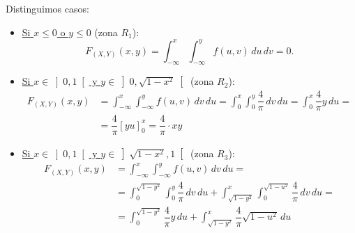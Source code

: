 \begin{ejercicio}
\begin{enumerate}
\begin{figure}[H]
        \end{figure}

        Distinguimos casos:
        \begin{itemize}
            \item \ul{Si $x\leq 0$ \quad o \quad $y\leq 0$} (zona $R_1$):
            \begin{equation*}
                F_{(X,Y)}(x, y) = \int_{-\infty}^x \int_{-\infty}^y f(u, v) \, du \, dv = 0.
            \end{equation*}

            \item \ul{Si $x\in \left]0,1\right[$ \quad y \quad $y\in \left]0,\sqrt{1-x^2}\right[$} (zona $R_2$):
            \begin{align*}
                F_{(X,Y)}(x, y) &= \int_{-\infty}^x \int_{-\infty}^y f(u, v) \, dv \, du = \int_{0}^x \int_{0}^y \dfrac{4}{\pi} \, dv \, du = \int_{0}^x \dfrac{4}{\pi}y \, du
                =\\&= \dfrac{4}{\pi}\left[yu\right]_0^x = \dfrac{4}{\pi}\cdot xy
            \end{align*}

            \item \ul{Si $x\in \left]0,1\right[$ \quad y \quad $y\in \left]\sqrt{1-x^2},1\right[$} (zona $R_3$):
            \begin{align*}
                F_{(X,Y)}(x, y) &= \int_{-\infty}^x \int_{-\infty}^y f(u, v) \, dv \, du =\\&= \int_{0}^{\sqrt{1-y^2}}\int_0^y \dfrac{4}{\pi} \, dv \, du + \int_{\sqrt{1-y^2}}^x \int_0^{\sqrt{1-u^2}} \dfrac{4}{\pi} \, dv \, du =\\
                &= \int_{0}^{\sqrt{1-y^2}} \dfrac{4}{\pi}y \, du + \int_{\sqrt{1-y^2}}^x \dfrac{4}{\pi}\sqrt{1-u^2} \, du
            \end{align*}


\end{itemize}
\end{enumerate}
\end{ejercicio}
